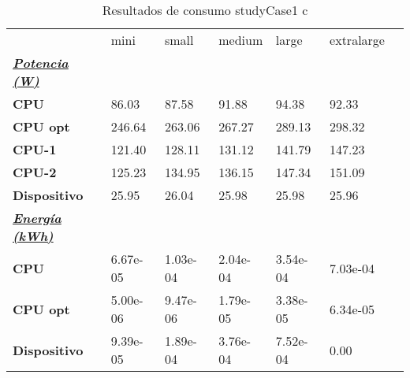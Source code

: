 \begin{table}[H]
    \centering
    \begin{tabular}{lllllll}
    \rowcolor[HTML]{DAE8FC} \ & mini & small & medium & 	large & 	extralarge \\
    \cellcolor[HTML]{DAE8FC} \textbf{\textbf{{\emph{{\underline{{Potencia (W)}}}}}}} &  &  &  & 	 & 	 \\
    \rowcolor[HTML]{EFEFEF} \cellcolor[HTML]{DAE8FC} \textbf{CPU} & 86.03 & 87.58 & 91.88 & 	94.38 & 	92.33 \\
    \cellcolor[HTML]{DAE8FC} \textbf{CPU opt} & 246.64 & 263.06 & 267.27 & 	289.13 & 	298.32 \\
    \rowcolor[HTML]{EFEFEF} \cellcolor[HTML]{DAE8FC} \textbf{\quad CPU-1} & 121.40 & 128.11 & 131.12 & 	141.79 & 	147.23 \\
    \cellcolor[HTML]{DAE8FC} \textbf{\quad CPU-2} & 125.23 & 134.95 & 136.15 & 	147.34 & 	151.09 \\
    \rowcolor[HTML]{EFEFEF} \cellcolor[HTML]{DAE8FC} \textbf{Dispositivo} & 25.95 & 26.04 & 25.98 & 	25.98 & 	25.96 \\
    \cellcolor[HTML]{DAE8FC} \textbf{\textbf{{\emph{{\underline{{Energía (kWh)}}}}}}} &  &  &  & 	 & 	 \\
    \rowcolor[HTML]{EFEFEF} \cellcolor[HTML]{DAE8FC} \textbf{CPU} & 6.67e-05 & 1.03e-04 & 2.04e-04 & 	3.54e-04 & 	7.03e-04 \\
    \cellcolor[HTML]{DAE8FC} \textbf{CPU opt} & 5.00e-06 & 9.47e-06 & 1.79e-05 & 	3.38e-05 & 	6.34e-05 \\
    \rowcolor[HTML]{EFEFEF} \cellcolor[HTML]{DAE8FC} \textbf{Dispositivo} & 9.39e-05 & 1.89e-04 & 3.76e-04 & 	7.52e-04 & 	0.00 \\
    \end{tabular}
    \caption[Resultados de consumo studyCase1 c]{{Resultados de consumo studyCase1 c}}
    \label{table_test_studyCase1_c_hw_powerResults}
\end{table}
